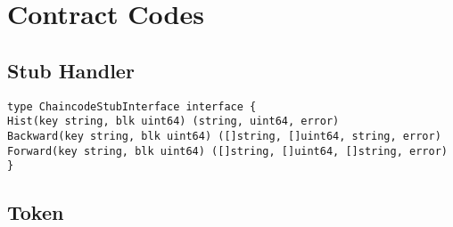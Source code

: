 \chapter{Contract Codes}
\label{ch:append:contracts}
\section{Stub Handler}
\label{ch:append:contracts:stub}


\begin{lstlisting}
type ChaincodeStubInterface interface {
Hist(key string, blk uint64) (string, uint64, error)
Backward(key string, blk uint64) ([]string, []uint64, string, error)
Forward(key string, blk uint64) ([]string, []uint64, []string, error)
}
\end{lstlisting}

\section{Token}
\label{ch:append:contracts:token}


